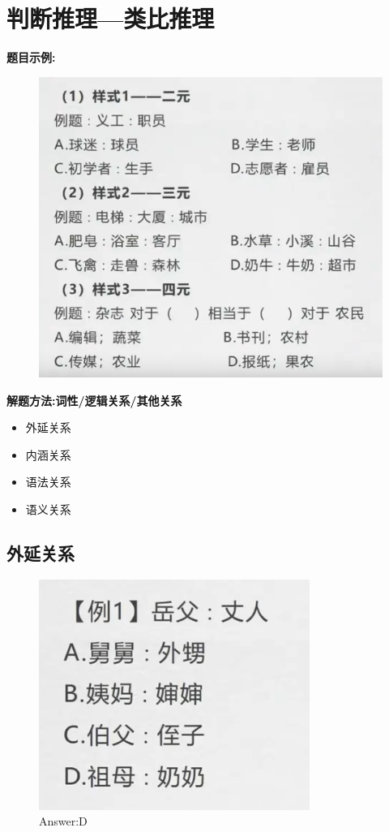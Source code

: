 \documentclass{article}
\numberwithin{equation}{section}						%
\numberwithin{figure}{section}							%
\begin{document}
\begin{sloppypar}
\section{判断推理---类比推理}


\textbf{题目示例:}

\begin{figure}[H]
     \centering
     \includegraphics[width=0.6\linewidth]{100.png}
\end{figure}


\textbf{解题方法:词性/逻辑关系/其他关系}


\begin{itemize}

	\item 
外延关系

\item
内涵关系

\item
语法关系

\item
语义关系

\end{itemize}


\subsection{外延关系}


\begin{figure}[H]
     \centering
     \includegraphics[width=0.4\linewidth]{101.png}
		\caption{Answer:D}
\end{figure}



\end{sloppypar}
\end{document}
